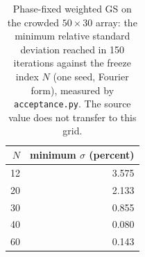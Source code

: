 \begin{table}[t]\centering\footnotesize
\caption{Phase-fixed weighted GS on the crowded $50\times30$ array: the minimum relative standard deviation reached in 150 iterations against the freeze index $N$ (one seed, Fourier form), measured by \texttt{acceptance.py}. The source value does not transfer to this grid.}\label{tab:nfix}
\begin{tabular}{@{}r r@{}}\toprule $N$ & minimum $\sigma$ (percent)\\\midrule
12 & 3.575\\
20 & 2.133\\
30 & 0.855\\
40 & 0.080\\
60 & 0.143\\
\bottomrule\end{tabular}\end{table}
